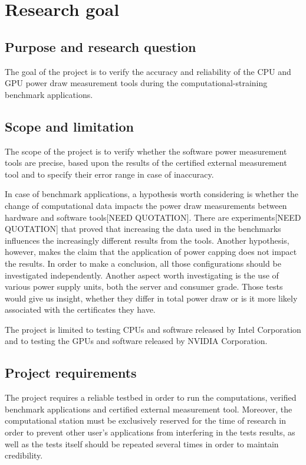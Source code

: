 \chapter{Research goal}

\section{Purpose and research question}

The goal of the project is to verify the accuracy and
reliability of the CPU and GPU power draw measurement
tools during the computational-straining benchmark applications.

\section{Scope and limitation}

The scope of the project is to verify whether the software
power measurement tools are precise, based upon the results
of the certified external measurement tool and to specify
their error range in case of inaccuracy.

In case of benchmark applications, a hypothesis worth
considering is whether the change of computational data
impacts the power draw measurements between hardware and
software tools[NEED QUOTATION]. There are
experiments[NEED QUOTATION] that proved that increasing
the data used in the benchmarks influences the increasingly
different results from the tools. Another hypothesis, however,
makes the claim that the application of power capping does
not impact the results. In order to make a conclusion, all
those configurations should be investigated independently.
Another aspect worth investigating is the use of various
power supply units, both the server and consumer grade. Those
tests would give us insight, whether they differ in total
power draw or is it more likely associated with the certificates
they have.

The project is limited to testing CPUs and software released
by Intel Corporation and to testing the GPUs and software
released by NVIDIA Corporation.

\section{Project requirements}

The project requires a reliable testbed in order to run the
computations, verified benchmark applications and certified
external measurement tool. Moreover, the computational station
must be exclusively reserved for the time of research in order
to prevent other user's applications from interfering in the
tests results, as well as the tests itself should be repeated
several times in order to maintain credibility.

